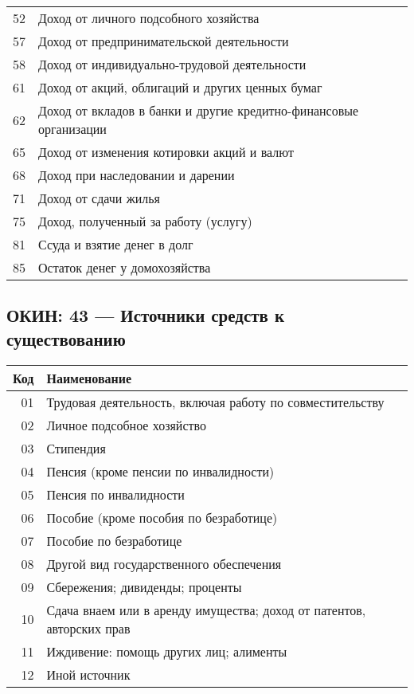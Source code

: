 \documentclass[10pt, a4paper, titlepage]{article}
\begin{document}
\begin{center}
\begin{longtable}{rp{}}
        52 & Доход от личного подсобного хозяйства \\
        57 & Доход от предпринимательской деятельности \\
        58 & Доход от индивидуально-трудовой деятельности \\
        61 & Доход от акций, облигаций и других ценных бумаг \\
        62 & Доход от вкладов в банки и другие кредитно-финансовые организации \\
        65 & Доход от изменения котировки акций и валют \\
        68 & Доход при наследовании и дарении \\
        71 & Доход от сдачи жилья \\
        75 & Доход, полученный за работу (услугу) \\
        81 & Ссуда и взятие денег в долг \\
        85 & Остаток денег у домохозяйства \\
    \end{longtable}
\end{center}

\subsection{ОКИН: 43 --- Источники средств к существованию}

\begin{center}
    \begin{longtable}{rp{}}
        \hline
        \textbf{Код} & \textbf{Наименование} \\ \hline
        01 & Трудовая деятельность, включая работу по совместительству \\
        02 & Личное подсобное хозяйство \\
        03 & Стипендия \\
        04 & Пенсия (кроме пенсии по инвалидности) \\
        05 & Пенсия по инвалидности \\
        06 & Пособие (кроме пособия по безработице) \\
        07 & Пособие по безработице \\
        08 & Другой вид государственного обеспечения \\
        09 & Сбережения; дивиденды; проценты \\
        10 & Сдача внаем или в аренду имущества; доход от патентов, авторских прав \\
        11 & Иждивение: помощь других лиц; алименты \\
        12 & Иной источник \\
    \end{longtable}
\end{center}
\end{document}
